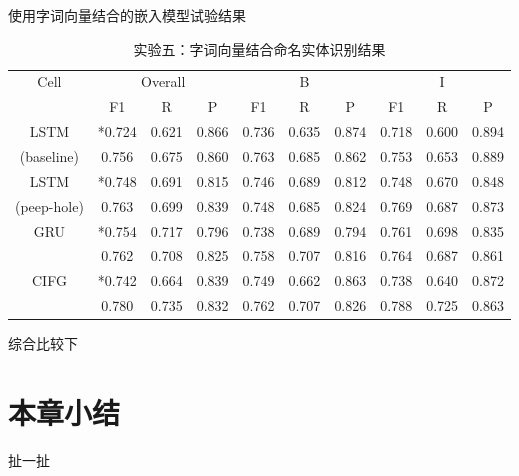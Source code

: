 使用字词向量结合的嵌入模型试验结果
\begin{table}[H]
    \centering
    \caption{实验五：字词向量结合命名实体识别结果}
    \begin{tabular}{cccccccccc}
        \toprule
            \multirow{2}{*}{Cell} &\multicolumn{3}{c}{Overall} &\multicolumn{3}{c}{B} &\multicolumn{3}{c}{I}\\
            \cmidrule(lr){2-4} \cmidrule(lr){5-7} \cmidrule(lr){8-10}
            & F1 & R & P & F1 & R & P & F1 & R & P\\
        \midrule
            LSTM & *0.724 & 0.621 & 0.866 & 0.736 & 0.635 & 0.874 & 0.718 & 0.600 & 0.894\\
            (baseline) & 0.756 & 0.675 & 0.860 & 0.763 & 0.685 & 0.862 & 0.753 & 0.653 & 0.889\\
            LSTM & *0.748 & 0.691 & 0.815 & 0.746 & 0.689 & 0.812 & 0.748 & 0.670 & 0.848\\
            (peep-hole) & 0.763 & 0.699 & 0.839 & 0.748 & 0.685 & 0.824 & 0.769 & 0.687 & 0.873\\
            \multirow{2}{2cm}{GRU} & *0.754 & 0.717 & 0.796 & 0.738 & 0.689 & 0.794 & 0.761 & 0.698 & 0.835\\
                                 & 0.762 & 0.708 & 0.825 & 0.758 & 0.707 & 0.816 & 0.764 & 0.687 & 0.861\\
            \multirow{2}{2cm}{CIFG} & *0.742 & 0.664 & 0.839 & 0.749 & 0.662 & 0.863 & 0.738 & 0.640 & 0.872\\
                                  & 0.780 & 0.735 & 0.832 & 0.762 & 0.707 & 0.826 & 0.788 & 0.725 & 0.863\\
        \bottomrule
    \end{tabular}
    \label{tab:tab1}
\end{table}

综合比较下

\section{本章小结}
扯一扯
